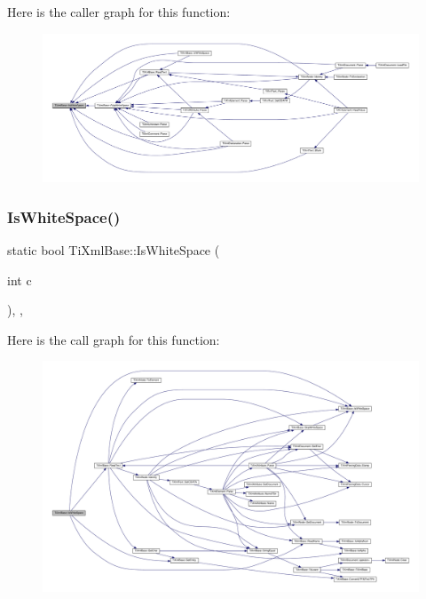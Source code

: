 Here is the caller graph for this function\+:\nopagebreak
\begin{figure}[H]
\begin{center}
\leavevmode
\includegraphics[width=350pt]{class_ti_xml_base_af56296d561c0bab4bc8e198cdcf5c48e_icgraph}
\end{center}
\end{figure}
\mbox{\label{class_ti_xml_base_a3de391ea9f4c4a8aa10d04480b048795}} 
\subsubsection{\texorpdfstring{Is\+White\+Space()}{IsWhiteSpace()}\hspace{0.1cm}{\footnotesize\ttfamily [2/2]}}
{\footnotesize\ttfamily static bool Ti\+Xml\+Base\+::\+Is\+White\+Space (\begin{DoxyParamCaption}\item[{int}]{c }\end{DoxyParamCaption})\hspace{0.3cm}{\ttfamily [inline]}, {\ttfamily [static]}, {\ttfamily [protected]}}

Here is the call graph for this function\+:\nopagebreak
\begin{figure}[H]
\begin{center}
\leavevmode
\includegraphics[width=350pt]{class_ti_xml_base_a3de391ea9f4c4a8aa10d04480b048795_cgraph}
\end{center}
\end{figure}
\mbox{\label{class_ti_xml_base_ad4b1472531c647a25b1840a87ae42438}} 
